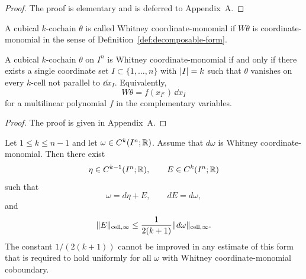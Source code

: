 \begin{proof}
The proof is elementary and is deferred to Appendix~A.
\end{proof}

\begin{definition}
\label{def:whitney-decomposable}
A cubical $k$-cochain $\theta$ is called Whitney coordinate-monomial if
$W\theta$ is coordinate-monomial in the sense of
Definition~\ref{def:decomposable-form}.
\end{definition}

\begin{proposition}
\label{prop:whitney-characterization}
A cubical $k$-cochain $\theta$ on $I^n$ is Whitney coordinate-monomial if and
only if there exists a single coordinate set
$I\subset\{1,\dots,n\}$ with $\lvert I \rvert=k$ such that $\theta$ vanishes on every
$k$-cell not parallel to $\dd x_I$. Equivalently,
\[
W\theta=f(x_{I^c})\,\dd x_I
\]
for a multilinear polynomial $f$ in the complementary variables.
\end{proposition}

\begin{proof}
The proof is given in Appendix~A.
\end{proof}

\begin{proposition}
\label{thm:discrete-stokes-poincare}
Let $1\le k\le n-1$ and let $\omega\in C^k(I^n;\mathbb{R})$. Assume that $d\omega$ is
Whitney coordinate-monomial. Then there exist
\[
\eta\in C^{k-1}(I^n;\mathbb{R}),
\qquad
E\in C^k(I^n;\mathbb{R})
\]
such that
\begin{equation}
\label{eq:discrete-decomposition}
\omega=d\eta+E,
\qquad
dE=d\omega,
\end{equation}
and
\begin{equation}
\label{eq:discrete-defect-bound}
\lVert E \rVert_{\mathrm{cell},\infty}\le
\frac{1}{2(k+1)}\lVert d\omega \rVert_{\mathrm{cell},\infty}.
\end{equation}
The constant $1/(2(k+1))$ cannot be improved in any estimate of this form that
is required to hold uniformly for all $\omega$ with Whitney
coordinate-monomial coboundary.
\end{proposition}

